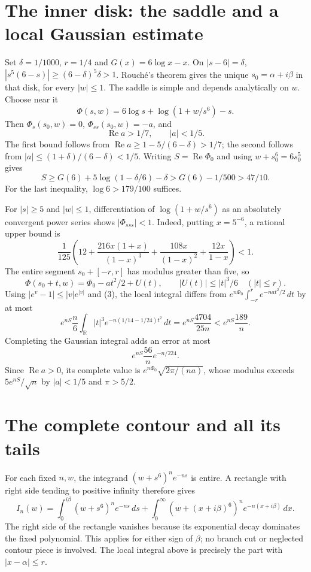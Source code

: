 \documentclass[11pt]{article}
\begin{document}
\section{The inner disk: the saddle and a local Gaussian estimate}
Set $\delta=1/1000$, $r=1/4$ and $G(x)=6\log x-x$.
On $|s-6|=\delta$,
$|s^5(6-s)|\ge(6-\delta)^5\delta>1$.
Rouch\'e's theorem gives the unique $s_0=\alpha+i\beta$ in that disk,
for every $|w|\le1$. The saddle is simple and depends analytically on $w$.
Choose near it
\[
 \Phi(s,w)=6\log s+\log(1+w/s^6)-s.
\]
Then $\Phi_s(s_0,w)=0$, $\Phi_{ss}(s_0,w)=-a$, and
\[
 \operatorname{Re}a>1/7,\qquad |a|<1/5.                 \tag{3}
\]
The first bound follows from
$\operatorname{Re}a\ge1-5/(6-\delta)>1/7$; the second follows from
$|a|\le(1+\delta)/(6-\delta)<1/5$.
Writing $S=\operatorname{Re}\Phi_0$ and using $w+s_0^6=6s_0^5$ gives
\[
 S\ge G(6)+5\log(1-\delta/6)-\delta
    >G(6)-1/500>47/10.                                \tag{4}
\]
For the last inequality, $\log6>179/100$ suffices.

For $|s|\ge5$ and $|w|\le1$, differentiation of
$\log(1+w/s^6)$ as an absolutely convergent power series shows
$|\Phi_{sss}|<1$. Indeed, putting $x=5^{-6}$, a rational upper bound is
\[
 \frac1{125}\left(12+
 \frac{216x(1+x)}{(1-x)^3}+
 \frac{108x}{(1-x)^2}+\frac{12x}{1-x}\right)<1.          \tag{5}
\]
The entire segment $s_0+[-r,r]$ has modulus greater than five, so
\[
 \Phi(s_0+t,w)=\Phi_0-at^2/2+U(t),\qquad
 |U(t)|\le|t|^3/6 \quad (|t|\le r).
\]
Using $|e^v-1|\le |v|e^{|v|}$ and (3), the local integral differs from
$e^{n\Phi_0}\int_{-r}^r e^{-nat^2/2}\,dt$ by at most
\[
 e^{nS}\frac n6\int_{\mathbb R}|t|^3
       e^{-n(1/14-1/24)t^2}\,dt
 =e^{nS}\frac{4704}{25n}<e^{nS}\frac{189}{n}.           \tag{6}
\]
Completing the Gaussian integral adds an error at most
\[
              e^{nS}\frac{56}{n}e^{-n/224}.            \tag{7}
\]
Since $\operatorname{Re}a>0$, its complete value is
$e^{n\Phi_0}\sqrt{2\pi/(na)}$, whose modulus exceeds
$5e^{nS}/\sqrt n$ by $|a|<1/5$ and $\pi>5/2$.

\section{The complete contour and all its tails}
For each fixed $n,w$, the integrand $(w+s^6)^ne^{-ns}$ is entire.
A rectangle with right side tending to positive infinity therefore gives
\[
 I_n(w)=\int_0^{i\beta}(w+s^6)^ne^{-ns}\,ds
       +\int_0^\infty(w+(x+i\beta)^6)^ne^{-n(x+i\beta)}\,dx. \tag{8}
\]
The right side of the rectangle vanishes because its exponential decay
dominates the fixed polynomial. This applies for either sign of $\beta$;
no branch cut or neglected contour piece is involved. The local integral
above is precisely the part with $|x-\alpha|\le r$.
\end{document}
